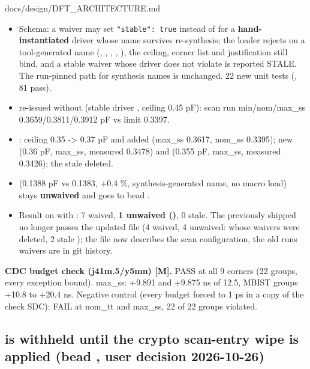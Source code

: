 \begin{relocated}{docs/design/DFT_ARCHITECTURE.md}
\begin{itemize}
\tightlist
\item
  Schema: a  waiver may set
  \texttt{"stable":\allowbreak{}\ true} instead of  for a
  \textbf{hand-instantiated} driver whose name survives re-synthesis;
  the loader rejects  on a tool-generated name
  (, , , ,
  ), the ceiling, corner list and justification still
  bind, and a stable waiver whose driver does not violate is reported
  STALE. The run-pinned path for synthesis names is unchanged. 22 new
  unit tests (, 81 pass).
\item
   re-issued without 
  (stable driver , ceiling 0.45
  pF): scan run min/\allowbreak{}nom/\allowbreak{}max\_\allowbreak{}ss
  0.3659/\allowbreak{}0.3811/\allowbreak{}0.3912 pF vs limit 0.3397.
\item
  : ceiling 0.35 -\textgreater{} 0.37 pF and
   added (max\_ss 0.3617, nom\_ss 0.3395); new
   (0.36 pF, max\_ss, measured 0.3478) and
   (0.355 pF, max\_ss, measured 0.3426); the stale
   deleted.
\item
   (0.1388 pF vs 0.1383, +0.4 \%, synthesis-generated
  name, no macro load) stays \textbf{unwaived} and goes to bead
  .
\item
  Result on  with : 7
  waived, \textbf{1 unwaived ()}, 0 stale. The
  previously shipped  no longer passes the
  updated file (4 waived, 4 unwaived:  whose
  waivers were deleted, 2 stale ); the file now
  describes the scan configuration, the old run\textquotesingle s
  waivers are in git history.
\end{itemize}

\textbf{CDC budget check (j41m.5/\allowbreak{}y5mn) {[}M{]}.}
 PASS at all 9 corners (22 groups,
every exception bound). max\_ss:  +9.891 and
 +9.875 ns of 12.5, MBIST groups +10.8 to +20.4 ns.
Negative control (every budget forced to 1 ps in a copy of the check
SDC): FAIL at nom\_tt and max\_ss, 22 of 22 groups violated.

\subsection{\texorpdfstring{ is withheld until the
crypto scan-entry wipe is applied (bead , user decision
2026-10-26)}{is withheld until the crypto scan-entry wipe is applied (bead , user decision 2026-10-26)}}\label{tm:ch:dft-architecture:1414-scan-en-is-withheld-until-the-crypto-scan-entry-wipe-is-applied-bead-j41m17-user-decision-2026-10-26}


\end{relocated}
